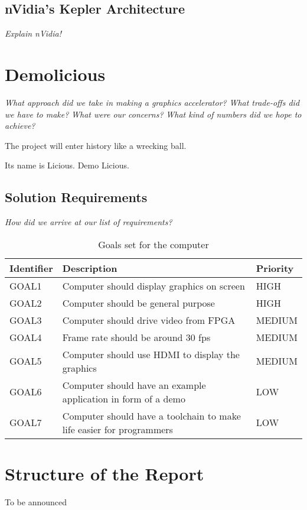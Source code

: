 \documentclass[../main/report.tex]{subfiles}
\begin{document}
\subsection{nVidia's Kepler Architecture} %

\textit{Explain nVidia!}

\section{Demolicious}

\textit{What approach did we take in making a graphics accelerator?}
\textit{What trade-offs did we have to make?}
\textit{What were our concerns?}
\textit{What kind of numbers did we hope to achieve?}

The project will enter history like a wrecking ball.

Its name is Licious. Demo Licious.

\subsection{Solution Requirements}

\textit{How did we arrive at our list of requirements?}

\begin{table}[htp]
    \centering
    \begin{tabular}{|l|p{8cm}|l|}
        \hline
        \textbf{Identifier}           & \textbf{Description}                & \textbf{Priority} \\ \hline
        GOAL1  & Computer should display graphics on screen                           & HIGH    \\ \hline
        GOAL2  & Computer should be general purpose                                   & HIGH    \\ \hline
        GOAL3  & Computer should drive video from FPGA                                & MEDIUM  \\ \hline
        GOAL4  & Frame rate should be around 30 fps                                   & MEDIUM  \\ \hline
        GOAL5  & Computer should use HDMI to display the graphics                     & MEDIUM  \\ \hline
        GOAL6  & Computer should have an example application in form of a demo        & LOW     \\ \hline
        GOAL7  & Computer should have a toolchain to make life easier for programmers & LOW     \\ \hline
    \end{tabular}
    \caption{Goals set for the computer}
    \label{tab:goals}
\end{table}

\newpage
\section{Structure of the Report}

To be announced
\end{document}

